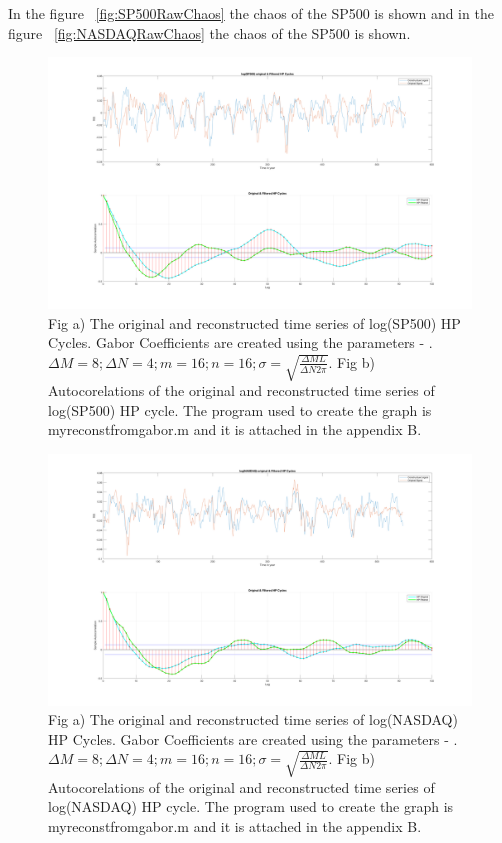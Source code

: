 In the figure ~\ref{fig:SP500RawChaos} the chaos of the SP500 is shown and in the figure ~\ref{fig:NASDAQRawChaos} the chaos of the SP500 is shown.


\begin{figure}[!ht]
\includegraphics[scale=.15]{Images/SP500Recon}
\caption{Fig a) The original and reconstructed time series of log(SP500) HP Cycles. Gabor Coefficients are created using the parameters - .$\Delta M = 8; \Delta N = 4; m = 16; n = 16; \sigma = \sqrt{\frac{\Delta M L}{\Delta N 2\pi}}$. Fig b) Autocorelations of the original and reconstructed time series of log(SP500) HP cycle. The program used to create the graph is myreconstfromgabor.m and it is attached in the appendix B.}
\label{fig:SP500Recon}
\end{figure}

\begin{figure}[!ht]
\includegraphics[scale=.15]{Images/NASRecon}
\caption{Fig a) The original and reconstructed time series of log(NASDAQ) HP Cycles. Gabor Coefficients are created using the parameters - .$\Delta M = 8; \Delta N = 4; m = 16; n = 16; \sigma = \sqrt{\frac{\Delta M L}{\Delta N 2\pi}}$. Fig b) Autocorelations of the original and reconstructed time series of log(NASDAQ) HP cycle. The program used to create the graph is myreconstfromgabor.m and it is attached in the appendix B.}
\label{fig:NASRecon}
\end{figure}

